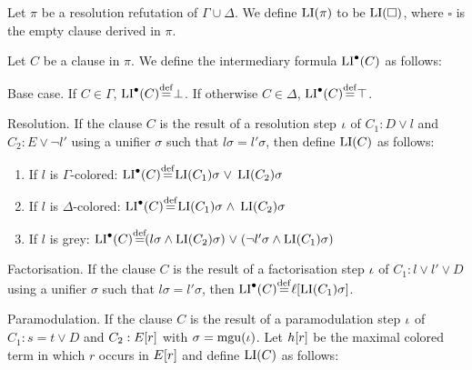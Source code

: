 \begin{defi}
	Let $\pi$ be a resolution refutation of $\Gamma \cup \Delta$.
	We define $\operatorname{LI}(\pi)$ to be $\operatorname{LI}(\square)$, where $\square$ is the empty clause derived in $\pi$.

	Let $C$ be a clause in $\pi$. 
	We define the intermediary formula $\operatorname{LI}^\bullet(C)$ as follows:
	\begin{description}
		\item{} Base case.
			If $C \in \Gamma$, $\LI^\bullet(C) \defeq \bot$.
			If otherwise $C \in \Delta$, $\LI^\bullet(C) \defeq \top$.

		\item{} Resolution.
			If the clause $C$ is the result of a resolution step $\iota$ of $C_1: D \lor l$ and $C_2: E \lor \lnot l'$ using a unifier $\sigma$ such that $l\sigma =  l'\sigma$, then define $\operatorname{LI}(C)$ as follows:
			\begin{enumerate}
				\item If $l$ is $\Gamma$-colored:
					$\LIpre(C) \defeq \LI(C_1)\sigma\spas\lor \LI(C_2)\sigma $

				\item If $l$ is $\Delta$-colored:
					$\LIpre(C) \defeq \LI(C_1)\sigma\spas\land \LI(C_2)\sigma$

				\item If $l$ is grey:
					$\LIpre(C) \defeq
					(l\sigma \land \LI(C_2)\sigma) \spas\lor
					(\lnot l'\sigma\land \LI(C_1)\sigma)
					$

			\end{enumerate}

		\item{} Factorisation.
			If the clause $C$ is the result of a factorisation step $\iota$ of $C_1: l \lor l' \lor D$ using a unifier $\sigma$ such that $l\sigma = l'\sigma$, then $\LIpre(C) \defeq \lifboth{\LI(C_1)\sigma}$.

		\item{} Paramodulation.
			If the clause $C$ is the result of a paramodulation step $\iota$ of $C_1 : s = t \lor D$ and $C_2: E[r]$ with $\sigma = \operatorname{mgu}(\iota)$.
			Let $h[r]$ be the maximal colored term in which $r$ occurs in $E[r]$
			and define $\operatorname{LI}(C)$ as follows:


\end{description}
\end{defi}
